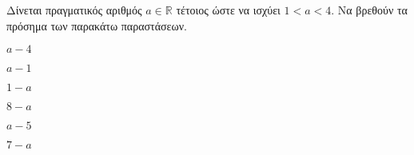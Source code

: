 Δίνεται πραγματικός αριθμός $ a\in\mathbb{R} $ τέτοιος ώστε να ισχύει $ 1<a<4 $. Να βρεθούν τα πρόσημα των παρακάτω παραστάσεων.
\begin{multicols}{3}
\begin{alist}
\item $ a-4 $
\item $ a-1 $
\item $ 1-a $
\item $ 8-a $
\item $ a-5 $
\item $ 7-a $
\end{alist}
\end{multicols}
